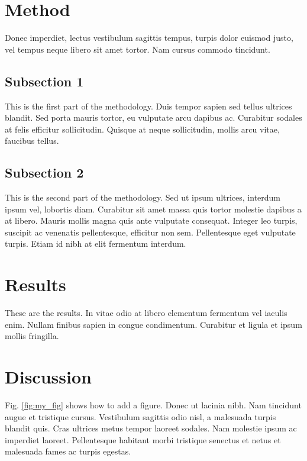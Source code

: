 \documentclass[12pt,a4paper,]{report}
\begin{document}
\hypertarget{method-1}{%
\section{Method}\label{method-1}}

Donec imperdiet, lectus vestibulum sagittis tempus, turpis dolor euismod
justo, vel tempus neque libero sit amet tortor. Nam cursus commodo
tincidunt.

\hypertarget{subsection-1}{%
\subsection{Subsection 1}\label{subsection-1}}

This is the first part of the methodology. Duis tempor sapien sed tellus
ultrices blandit. Sed porta mauris tortor, eu vulputate arcu dapibus ac.
Curabitur sodales at felis efficitur sollicitudin. Quisque at neque
sollicitudin, mollis arcu vitae, faucibus tellus.

\hypertarget{subsection-2-1}{%
\subsection{Subsection 2}\label{subsection-2-1}}

This is the second part of the methodology. Sed ut ipsum ultrices,
interdum ipsum vel, lobortis diam. Curabitur sit amet massa quis tortor
molestie dapibus a at libero. Mauris mollis magna quis ante vulputate
consequat. Integer leo turpis, suscipit ac venenatis pellentesque,
efficitur non sem. Pellentesque eget vulputate turpis. Etiam id nibh at
elit fermentum interdum.

\hypertarget{results-1}{%
\section{Results}\label{results-1}}

These are the results. In vitae odio at libero elementum fermentum vel
iaculis enim. Nullam finibus sapien in congue condimentum. Curabitur et
ligula et ipsum mollis fringilla.

\hypertarget{discussion-1}{%
\section{Discussion}\label{discussion-1}}

Fig. \ref{fig:my_fig} shows how to add a figure. Donec ut lacinia nibh.
Nam tincidunt augue et tristique cursus. Vestibulum sagittis odio nisl,
a malesuada turpis blandit quis. Cras ultrices metus tempor laoreet
sodales. Nam molestie ipsum ac imperdiet laoreet. Pellentesque habitant
morbi tristique senectus et netus et malesuada fames ac turpis egestas.
\end{document}
